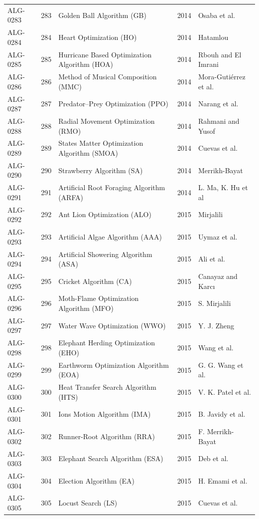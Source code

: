 \documentclass[8pt]{article}
\begin{document}
\begin{landscape}
\begin{longtable}{P{1.7cm}rP{10.0cm}rP{7.2cm}}
ALG-0283 & 283 & Golden Ball Algorithm (GB) & 2014 & Osaba et al. \\
ALG-0284 & 284 & Heart Optimization (HO) & 2014 & Hatamlou \\
ALG-0285 & 285 & Hurricane Based Optimization Algorithm (HOA) & 2014 & Rbouh and El Imrani \\
ALG-0286 & 286 & Method of Musical Composition (MMC) & 2014 & Mora-Gutiérrez et al. \\
ALG-0287 & 287 & Predator–Prey Optimization (PPO) & 2014 & Narang et al. \\
ALG-0288 & 288 & Radial Movement Optimization (RMO) & 2014 & Rahmani and Yusof \\
ALG-0289 & 289 & States Matter Optimization Algorithm (SMOA) & 2014 & Cuevas et al. \\
ALG-0290 & 290 & Strawberry Algorithm (SA) & 2014 & Merrikh-Bayat \\
ALG-0291 & 291 & Artificial Root Foraging Algorithm (ARFA) & 2014 & L. Ma, K. Hu et al \\
ALG-0292 & 292 & Ant Lion Optimization (ALO) & 2015 & Mirjalili \\
ALG-0293 & 293 & Artificial Algae Algorithm (AAA) & 2015 & Uymaz et al. \\
ALG-0294 & 294 & Artificial Showering Algorithm (ASA) & 2015 & Ali et al. \\
ALG-0295 & 295 & Cricket Algorithm (CA) & 2015 & Canayaz and Karcı \\
ALG-0296 & 296 & Moth-Flame Optimization Algorithm (MFO) & 2015 & S. Mirjalili \\
ALG-0297 & 297 & Water Wave Optimization (WWO) & 2015 & Y. J. Zheng \\
ALG-0298 & 298 & Elephant Herding Optimization (EHO) & 2015 & Wang et al. \\
ALG-0299 & 299 & Earthworm Optimization Algorithm (EOA) & 2015 & G. G. Wang et al. \\
ALG-0300 & 300 & Heat Transfer Search Algorithm (HTS) & 2015 & V. K. Patel et al. \\
ALG-0301 & 301 & Ions Motion Algorithm (IMA) & 2015 & B. Javidy et al. \\
ALG-0302 & 302 & Runner-Root Algorithm (RRA) & 2015 & F. Merrikh-Bayat \\
ALG-0303 & 303 & Elephant Search Algorithm (ESA) & 2015 & Deb et al. \\
ALG-0304 & 304 & Election Algorithm (EA) & 2015 & H. Emami et al. \\
ALG-0305 & 305 & Locust Search (LS) & 2015 & Cuevas et al. \\

\end{longtable}
\end{landscape}
\end{document}
